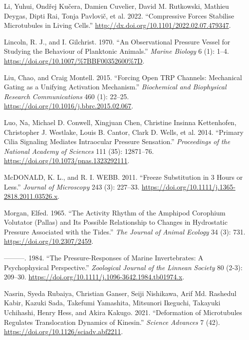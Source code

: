 \documentclass[
]{article}
\newlength{\cslhangindent}
\newlength{\cslentryspacingunit} %
\newenvironment{CSLReferences}[2] %
 {%
  \setlength{\parindent}{0pt}
  \ifodd #1
  \let\oldpar\par
  \def\par{\hangindent=\cslhangindent\oldpar}
  \fi
  \setlength{\parskip}{#2\cslentryspacingunit}
 }%
 {}
\begin{document}
\begin{CSLReferences}{1}{0}
\leavevmode{}%
Li, Yuhui, Ondřej Kučera, Damien Cuvelier, David M. Rutkowski, Mathieu
Deygas, Dipti Rai, Tonja Pavlovič, et al. 2022. {``Compressive Forces
Stabilise Microtubules in Living Cells.''}
\url{http://dx.doi.org/10.1101/2022.02.07.479347}.

\leavevmode{}%
Lincoln, R. J., and I. Gilchrist. 1970. {``An Observational Pressure
Vessel for Studying the Behaviour of Planktonic Animals.''} \emph{Marine
Biology} 6 (1): 1--4. \url{https://doi.org/10.1007/\%7BBF00352600\%7D}.

\leavevmode{}%
Liu, Chao, and Craig Montell. 2015. {``Forcing Open TRP Channels:
Mechanical Gating as a Unifying Activation Mechanism.''}
\emph{Biochemical and Biophysical Research Communications} 460 (1):
22--25. \url{https://doi.org/10.1016/j.bbrc.2015.02.067}.

\leavevmode{}%
Luo, Na, Michael D. Conwell, Xingjuan Chen, Christine Insinna
Kettenhofen, Christopher J. Westlake, Louis B. Cantor, Clark D. Wells,
et al. 2014. {``Primary Cilia Signaling Mediates Intraocular Pressure
Sensation.''} \emph{Proceedings of the National Academy of Sciences} 111
(35): 12871--76. \url{https://doi.org/10.1073/pnas.1323292111}.

\leavevmode{}%
McDONALD, K. L., and R. I. WEBB. 2011. {``Freeze Substitution in 3 Hours
or Less.''} \emph{Journal of Microscopy} 243 (3): 227--33.
\url{https://doi.org/10.1111/j.1365-2818.2011.03526.x}.

\leavevmode{}%
Morgan, Elfed. 1965. {``The Activity Rhythm of the Amphipod Corophium
Volutator (Pallas) and Its Possible Relationship to Changes in
Hydrostatic Pressure Associated with the Tides.''} \emph{The Journal of
Animal Ecology} 34 (3): 731. \url{https://doi.org/10.2307/2459}.

\leavevmode{}%
---------. 1984. {``The Pressure-Responses of Marine Invertebrates: A
Psychophysical Perspective.''} \emph{Zoological Journal of the Linnean
Society} 80 (2-3): 209--30.
\url{https://doi.org/10.1111/j.1096-3642.1984.tb01974.x}.

\leavevmode{}%
Nasrin, Syeda Rubaiya, Christian Ganser, Seiji Nishikawa, Arif Md.
Rashedul Kabir, Kazuki Sada, Takefumi Yamashita, Mitsunori Ikeguchi,
Takayuki Uchihashi, Henry Hess, and Akira Kakugo. 2021. {``Deformation
of Microtubules Regulates Translocation Dynamics of Kinesin.''}
\emph{Science Advances} 7 (42).
\url{https://doi.org/10.1126/sciadv.abf2211}.


\end{CSLReferences}
\end{document}
